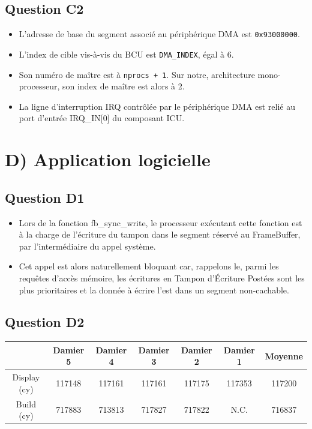 \documentclass[10pt]{article}
\begin{document}
\subsection{Question C2}
\begin{itemize}
  \item L'adresse de base du segment associé au périphérique DMA est
  \texttt{0x93000000}.
  \item L'index de cible vis-à-vis du BCU est \texttt{DMA\_INDEX}, égal à 6.
  \item Son numéro de maître est à \texttt{nprocs + 1}. Sur notre, architecture
  mono-processeur, son index de maître est alors à 2.
  \item La ligne d'interruption IRQ contrôlée par le périphérique DMA est relié
  au port d'entrée IRQ\_IN[0] du composant ICU.
\end{itemize}

\section{D) Application logicielle}
\subsection{Question D1}
\begin{itemize}
  \item Lors de la fonction fb\_sync\_write, le processeur exécutant cette
  fonction est à la charge de l'écriture du tampon dans le segment réservé
  au FrameBuffer, par l'intermédiaire du appel système.
  \item Cet appel est alors naturellement bloquant car, rappelons le, parmi
  les requêtes d'accès mémoire, les écritures en Tampon d'Écriture Postées sont
  les plus prioritaires et la donnée à écrire l'est dans un segment non-cachable.
\end{itemize}

\subsection{Question D2}
\begin{center}
  \begin{tabular}{|c|c|c|c|c|c|c|}
    \hline
     & Damier 5 & Damier 4 & Damier 3 & Damier 2 & Damier 1 & Moyenne \\ \hline
     Display (cy) & 117148 & 117161 & 117161 & 117175 & 117353 & 117200 \\ \hline
     Build (cy) & 717883 & 713813 & 717827 & 717822 & N.C. & 716837 \\ \hline
  \end{tabular}
\end{center}
\end{document}
